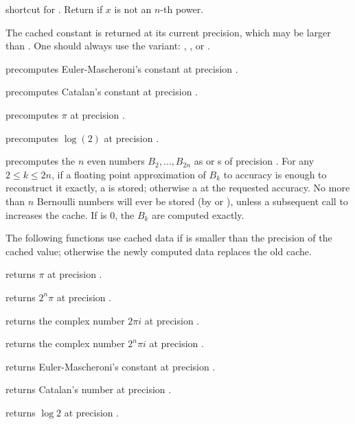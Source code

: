  shortcut for . Return  if $x$ is not an $n$-th power.


The cached constant is returned at its current precision, which may be larger
than . One should always use the  variant:
, , or .

 precomputes Euler-Mascheroni's constant
at precision .

 precomputes Catalan's constant at precision
.

 precomputes $\pi$ at precision .

 precomputes $\log(2)$ at precision
.

 precomputes the $n$ even
 numbers $B_2,\dots,B_{2n}$ as  or s of
precision . For any $2 \leq k \leq 2n$, if a floating point
approximation of $B_k$ to accuracy  is enough to reconstruct it
exactly, a  is stored; otherwise a  at the requested
accuracy. No more than $n$ Bernoulli numbers will ever be stored (by
 or ), unless a subsequent call to 
increases the cache. If  is $0$, the $B_k$ are computed exactly.

The following functions use cached data if  is smaller than the
precision of the cached value; otherwise the newly computed data replaces the
old cache.

 returns $\pi$ at precision .

 returns $2^n\pi$ at precision .

 returns the complex number $2\pi i$ at
precision .

 returns the complex number $2^n\pi i$ at
precision .

 returns Euler-Mascheroni's constant at
precision .

 returns Catalan's number at precision .

 returns $\log 2$ at precision .

